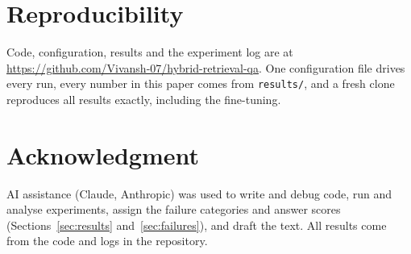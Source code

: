 \documentclass[runningheads]{llncs}
\begin{document}
\section*{Reproducibility}
Code, configuration, results and the experiment log are at
\url{https://github.com/Vivansh-07/hybrid-retrieval-qa}. One configuration file
drives every run, every number in this paper comes from \texttt{results/}, and a
fresh clone reproduces all results exactly, including the fine-tuning.

\section*{Acknowledgment}
AI assistance (Claude, Anthropic) was used to write and debug code, run and
analyse experiments, assign the failure categories and answer scores
(Sections~\ref{sec:results} and~\ref{sec:failures}), and draft the text. All
results come from the code and logs in the repository.



\end{document}
